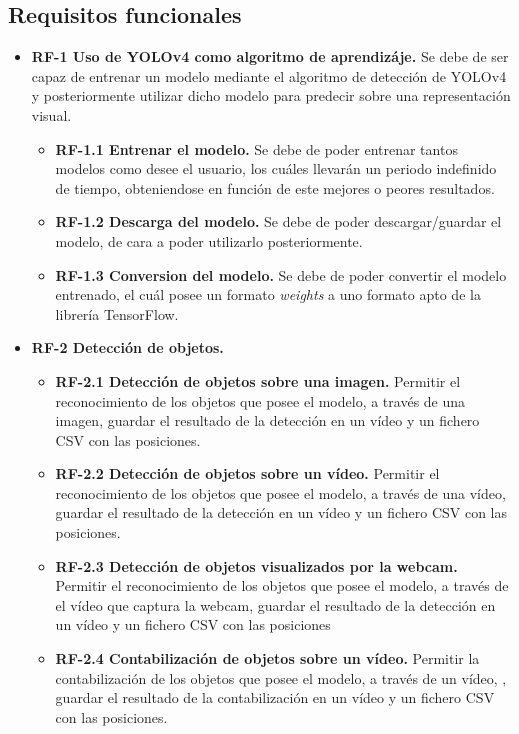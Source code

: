 \subsection{Requisitos funcionales}
\begin{itemize}
    \tightlist
    \item \textbf{RF-1 Uso de YOLOv4 como algoritmo de aprendizáje.} Se debe de ser capaz de entrenar un modelo mediante el algoritmo de detección de YOLOv4 y posteriormente utilizar dicho modelo para predecir sobre una representación visual.
    \begin{itemize}
    \tightlist
    \item \textbf{RF-1.1 Entrenar el modelo.} Se debe de poder entrenar tantos modelos como desee el usuario, los cuáles llevarán un periodo indefinido de tiempo, obteniendose en función de este mejores o peores resultados.
    \item \textbf{RF-1.2 Descarga del modelo.} Se debe de poder descargar/guardar el modelo, de cara a poder utilizarlo posteriormente.
    \item \textbf{RF-1.3 Conversion del modelo.} Se debe de poder convertir el modelo entrenado, el cuál posee un formato \textit{weights} a uno formato apto de la librería TensorFlow.
    \end{itemize}
    \item \textbf{RF-2 Detección de objetos.}
    \begin{itemize}
      \tightlist
      \item \textbf{RF-2.1 Detección de objetos sobre una imagen.} Permitir el reconocimiento de los objetos que posee el modelo, a través de una imagen, guardar el resultado de la detección en un vídeo y un fichero CSV con las posiciones.
      \item \textbf{RF-2.2 Detección de objetos sobre un vídeo.} Permitir el reconocimiento de los objetos que posee el modelo, a través de una vídeo, guardar el resultado de la detección en un vídeo y un fichero CSV con las posiciones.
      \item \textbf{RF-2.3 Detección de objetos visualizados por la webcam.} Permitir el reconocimiento de los objetos que posee el modelo, a través de el vídeo que captura la webcam, guardar el resultado de la detección en un vídeo y un fichero CSV con las posiciones
      \item \textbf{RF-2.4 Contabilización de objetos sobre un vídeo.} Permitir la contabilización de los objetos que posee el modelo, a través de un vídeo, , guardar el resultado de la contabilización en un vídeo y un fichero CSV con las posiciones.

\end{itemize}
\end{itemize}
